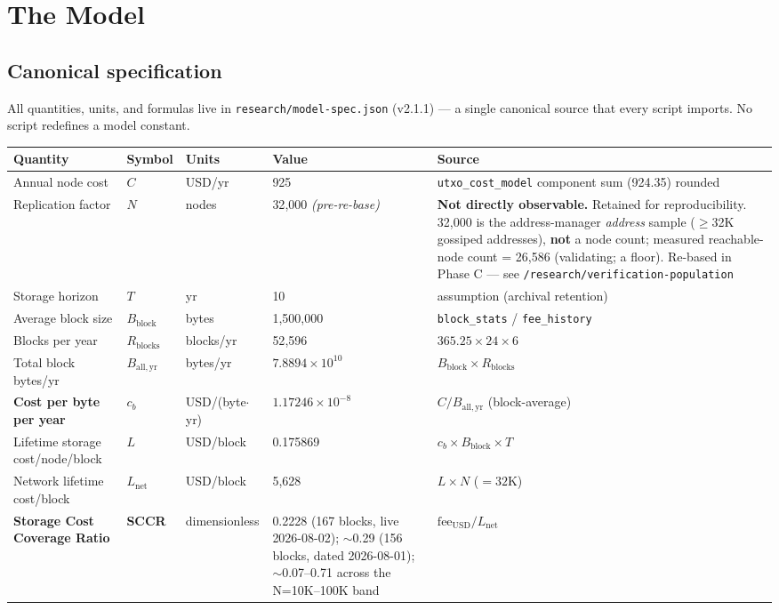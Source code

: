 \documentclass[11pt]{article}
\begin{document}
\section{The Model}\label{sec:4}
\subsection{Canonical specification}\label{sec:4.1}
All quantities, units, and formulas live in \texttt{research/model-spec.json} (v2.1.1) --- a single canonical source that every script imports. No script redefines a model constant.
\begin{center}
\renewcommand{\arraystretch}{1.25}
\begin{tabular}{lllll}
\toprule
Quantity & Symbol & Units & Value & Source \\
\midrule
Annual node cost & $C$ & USD/yr & 925 & \texttt{utxo\_cost\_model} component sum (924.35) rounded \\
Replication factor & $N$ & nodes & 32{,}000 \emph{(pre-re-base)} & \textbf{Not directly observable.} Retained for reproducibility. 32{,}000 is the address-manager \emph{address} sample ($\geq$32K gossiped addresses), \textbf{not} a node count; measured reachable-node count = 26{,}586 (validating; a floor). Re-based in Phase C --- see \texttt{/research/verification-population} \\
Storage horizon & $T$ & yr & 10 & assumption (archival retention) \\
Average block size & $B_{\mathrm{block}}$ & bytes & 1{,}500{,}000 & \texttt{block\_stats} / \texttt{fee\_history} \\
Blocks per year & $R_{\mathrm{blocks}}$ & blocks/yr & 52{,}596 & $365.25 \times 24 \times 6$ \\
Total block bytes/yr & $B_{\mathrm{all,yr}}$ & bytes/yr & $7.8894\times10^{10}$ & $B_{\mathrm{block}} \times R_{\mathrm{blocks}}$ \\
\textbf{Cost per byte per year} & \textbf{$c_b$} & USD/(byte$\cdot$yr) & \textbf{$1.17246\times10^{-8}$} & $C / B_{\mathrm{all,yr}}$ (block-average) \\
Lifetime storage cost/node/block & $L$ & USD/block & 0.175869 & $c_b \times B_{\mathrm{block}} \times T$ \\
Network lifetime cost/block & $L_{\mathrm{net}}$ & USD/block & 5{,}628 & $L \times N$ ($=32$K) \\
\textbf{Storage Cost Coverage Ratio} & \textbf{SCCR} & dimensionless & 0.2228 (167 blocks, live 2026-08-02); $\sim$0.29 (156 blocks, dated 2026-08-01); $\sim$0.07--0.71 across the N=10K--100K band & $\mathrm{fee}_{\mathrm{USD}} / L_{\mathrm{net}}$ \\
\bottomrule
\end{tabular}
\end{center}
\end{document}
